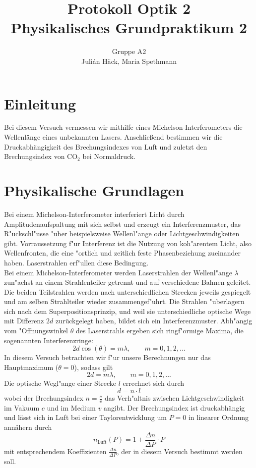\documentclass[12pt,a4paper]{article}
\author{Gruppe A2 \\ Julián Häck, Maria Spethmann}
\title{Protokoll Optik 2 \\ Physikalisches Grundpraktikum 2}
\begin{document}
	\maketitle
	\thispagestyle{empty} %
	\newpage
	\pagestyle{headings} %
	\tableofcontents
	\newpage


\section{Einleitung}
Bei diesem Versuch vermessen wir mithilfe eines Michelson-Interferometers die Wellenlänge eines unbekannten Lasers. Anschließend bestimmen wir die Druckabhängigkeit des Brechungsindexes von Luft  und zuletzt den Brechungsindex von $\text{CO}_\text{2}$ bei Normaldruck.
\section{Physikalische Grundlagen} 
Bei einem Michelson-Interferometer interferiert Licht durch Amplitudenaufspaltung mit sich selbst und erzeugt ein Interferenzmuster, das R"uckschl"usse "uber beispielsweise Wellenl"ange oder Lichtgeschwindigkeiten gibt. Vorraussetzung f"ur Interferenz ist die Nutzung von koh"arentem Licht, also Wellenfronten, die eine "ortlich und zeitlich feste Phasenbeziehung zueinander haben. Laserstrahlen erf"ullen diese Bedingung.\\
Bei einem Michelson-Interferometer werden Laserstrahlen der Wellenl"ange $\lambda$ zun"achst an einem Strahlenteiler getrennt und auf verschiedene Bahnen geleitet. Die beiden Teilstrahlen werden nach unterschiedlichen Strecken jeweils gespiegelt und am selben Strahlteiler wieder zusammengef"uhrt. Die Strahlen "uberlagern sich nach dem Superpositionsprinzip, und weil sie unterschiedliche optische Wege mit Differenz $2d$ zurückgelegt haben, bildet sich ein Interferenzmuster. Abh"angig vom  "Offnungswinkel $\theta$ des Laserstrahls ergeben sich ringf"ormige Maxima, die sogenannten Interferenzringe:
\begin{equation}\label{eq:Interferenzmuster}
2d\cos(\theta)=m\lambda,\qquad m=0,1,2,...
\end{equation}
In diesem Versuch betrachten wir f"ur unsere Berechnungen nur das Hauptmaximum ($\theta=0$), sodass gilt
\begin{equation}\label{eq:Grundgleichung}
2d=m\lambda,\qquad m=0,1,2,...
\end{equation}
Die optische Wegl"ange einer Strecke $l$ errechnet sich durch 
\begin{equation}\label{eq:d=nl}
d=n\cdot l
\end{equation}
wobei der Brechungsindex $n=\frac{c}{v}$ das Verh"altnis zwischen Lichtgeschwindigkeit im Vakuum $c$ und im Medium $v$ angibt.
Der Brechungsindex ist druckabhängig und lässt sich in Luft bei einer Taylorentwicklung um $P=0$ in linearer Ordnung annähern durch 
\begin{equation}
n_{\text{Luft}}(P)=1+\frac{\Delta n}{\Delta P}\cdot P
\end{equation}
mit entsprechendem Koeffizienten  $\frac{\Delta n}{\Delta P}$, der in diesem Versuch bestimmt werden soll.
\end{document}
